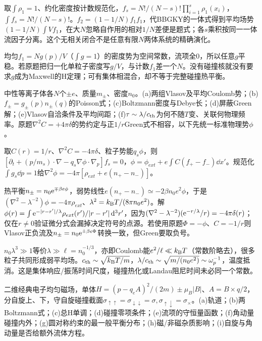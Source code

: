 \begin{solution}
取$\int\rho_1=1$、约化密度按计数规范化，$f_s=N!/(N-s)!\prod_{i=1}^s\rho_1(x_i)$，$\int f_s=N!/(N-s)!$。$f_2=(1-1/N)f_1f_1$，代BBGKY的一体式得到平均场势$(1-1/N)\int Vf_1$，在大$N$忽略自作用的相对$1/N$差便是题式；各$s$乘积按同一一体流因子分离。这个无相关闭合不是任意有限$N$两体系统的精确演化。

均匀$f_1=N g(p)/V$（$\int g=1$）的密度势为空间常数，流项全0，所以任意$g$平稳。若原题把归一化单粒子密度写$g/V$，与计数$f_1$差一个$N$。没有碰撞核就没有要求$g$成为Maxwell的H定理；可有集体相混合，却不等于完整碰撞热平衡。
\end{solution}
\begin{exercise}[原题4(a)--(f)]\label{r:333-2-4}
中性等离子体各$N$个$\pm e$、质量$m_\pm$、密度$n_0$。(a)两组Vlasov及平均Coulomb势；(b)$f_\pm=g_\pm(p)n_\pm(q)$的Poisson式；(c)Boltzmann密度与Debye长；(d)屏蔽Green解；(e)Vlasov自洽条件及平均间距；(f)$\tau\sim\lambda/c_{\rm th}$为何不随$T$变、关联何物理频率。原题$\nabla^2C=+4\pi\delta$的势约定与正$1/r$Green式不相容，以下先统一标准物理势$\phi$。
\end{exercise}
\begin{solution}
取$C(r)=1/r$、$\nabla^2C=-4\pi\delta$、粒子势能$q_s\phi$，则$[\partial_t+(p/m_s)\cdot\nabla-q_s\nabla\phi\cdot\nabla_p]f_s=0$，$\phi=\phi_{ext}+e\int C(f_+-f_-)\dd x'$。规范化$\int g_s\dd p=1$给$\nabla^2\phi=-4\pi[\rho_{ext}+e(n_+-n_-)]$。

热平衡$n_\pm=n_0\mathrm e^{\mp\beta e\phi}$，弱势线性$e(n_+-n_-)\simeq-2\beta n_0e^2\phi$，于是$(\nabla^2-\lambda^{-2})\phi=-4\pi\rho_{ext}$、$\lambda^2=k_{\mathrm B} T/(8\pi n_0e^2)$。解$\phi(r)=\int\mathrm e^{-|r-r'|/\lambda}\rho_{ext}(r')/|r-r'|\,\mathrm d^3r'$，因为$(\nabla^2-\lambda^{-2})(\mathrm e^{-r/\lambda}/r)=-4\pi\delta(r)$；仅在$r\ne0$验证微分式会漏掉决定符号的点源。若使用原题$\Phi=-\phi$、$C=-1/r$则Vlasov正负流及$n_\pm=n_0\mathrm e^{\pm\beta e\Phi}$转换一致，但Green要取负号。

$n_0\lambda^3\gg1$等价$\lambda\gg\ell=n_0^{-1/3}$，亦即Coulomb能$e^2/\ell\ll k_{\mathrm B} T$（常数阶略去），很多粒子共同形成弱平均场。$c_{\rm th}\sim\sqrt{k_{\mathrm B} T/m}$，$\lambda/c_{\rm th}\sim\sqrt{m/(n_0e^2)}\sim\omega_p^{-1}$，温度抵消。这是集体响应/振荡时间尺度，碰撞热化或Landau阻尼时间未必同一个常数。
\end{solution}
\begin{exercise}[原题5(a)--(i)]\label{r:333-2-5}
二维经典电子均匀磁场，单体$H=(p-q_eA)^2/(2m)\pm\mu_B|B|$、$A=B\times q/2$，分自旋上、下，守自旋碰撞截面$\sigma_{\uparrow\uparrow}=\sigma_{\downarrow\downarrow}=\sigma,\sigma_{\uparrow\downarrow}=\sigma_\times$。(a)轨道；(b)两Boltzmann式；(c)总H单调；(d)碰撞零项条件；(e)流项的守恒量函数；(f)角动量碰撞内外；(g)圆对称约束的最一般平衡分布；(h)磁/非磁杂质影响；(i)自旋与角动量是否给额外流体方程。
\end{exercise}
